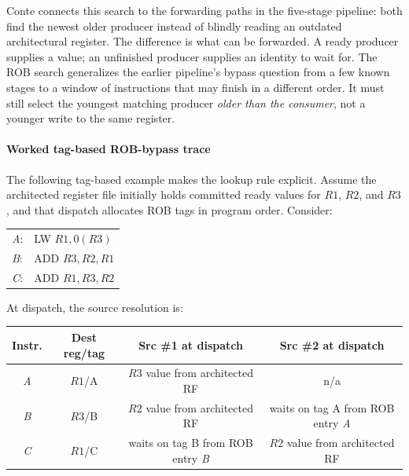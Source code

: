 Conte connects this search to the forwarding paths in the five-stage pipeline: both find the newest older producer instead of blindly reading an outdated architectural register.
The difference is what can be forwarded.
A ready producer supplies a value; an unfinished producer supplies an identity to wait for.
The ROB search generalizes the earlier pipeline's bypass question from a few known stages to a window of instructions that may finish in a different order.
It must still select the youngest matching producer \emph{older than the consumer}, not a younger write to the same register.

\paragraph{Worked tag-based ROB-bypass trace}\label{par:ilp-rob-bypass-worked}
The following tag-based example makes the lookup rule explicit.
Assume the architected register file initially holds committed ready values for $R1$, $R2$, and $R3$, and that dispatch allocates ROB tags in program order.
Consider:

    {\small
\begin{center}
    \begin{tabular}{@{}ll@{}}
        \textit{A}: & LW $R1,0(R3)$  \\
        \textit{B}: & ADD $R3,R2,R1$ \\
        \textit{C}: & ADD $R1,R3,R2$
    \end{tabular}
\end{center}}

At dispatch, the source resolution is:

    {\small
\begin{center}
    \renewcommand{\arraystretch}{1.15}
    \begin{tabular}{|c|c|c|c|}
        \hline
        Instr.
        & Dest reg/tag & Src \#1 at dispatch                      & Src \#2 at dispatch                      \\
        \hline
        \textit{A} & $R1$/A       & $R3$ value from architected RF           & n/a                                      \\
        \hline
        \textit{B} & $R3$/B       & $R2$ value from architected RF           & waits on tag A from ROB entry \textit{A} \\
        \hline
        \textit{C} & $R1$/C       & waits on tag B from ROB entry \textit{B} & $R2$ value from architected RF           \\
        \hline
    \end{tabular}
\end{center}}

